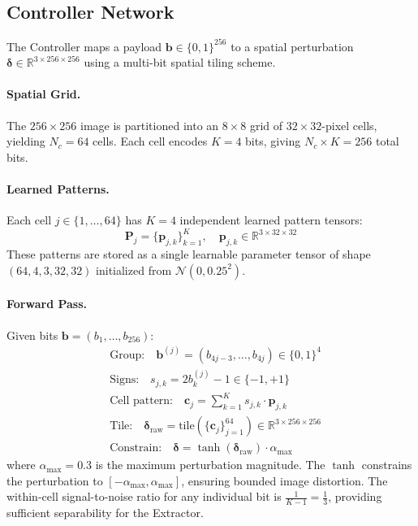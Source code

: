 \documentclass[10pt, twocolumn]{article}
\newcommand{\R}{\mathbb{R}}
\newcommand{\Ncal}{\mathcal{N}}
\begin{document}
\subsection{Controller Network}
\label{sec:controller}

The Controller maps a payload $\mathbf{b} \in \{0,1\}^{256}$ to a spatial perturbation $\bm{\delta} \in \R^{3 \times 256 \times 256}$ using a multi-bit spatial tiling scheme.

\paragraph{Spatial Grid.}
The $256 \times 256$ image is partitioned into an $8 \times 8$ grid of $32 \times 32$-pixel cells, yielding $N_c = 64$ cells.
Each cell encodes $K = 4$ bits, giving $N_c \times K = 256$ total bits.

\paragraph{Learned Patterns.}
Each cell $j \in \{1, \ldots, 64\}$ has $K = 4$ independent learned pattern tensors:
\begin{equation}
    \mathbf{P}_j = \{\mathbf{p}_{j,k}\}_{k=1}^{K}, \quad \mathbf{p}_{j,k} \in \R^{3 \times 32 \times 32}
    \label{eq:patterns}
\end{equation}
These patterns are stored as a single learnable parameter tensor of shape $(64, 4, 3, 32, 32)$ initialized from $\Ncal(0, 0.25^2)$.

\paragraph{Forward Pass.}
Given bits $\mathbf{b} = (b_1, \ldots, b_{256})$:
\begin{align}
    &\text{Group:} \quad \mathbf{b}^{(j)} = (b_{4j-3}, \ldots, b_{4j}) \in \{0,1\}^4 \label{eq:group} \\
    &\text{Signs:} \quad s_{j,k} = 2 b^{(j)}_k - 1 \in \{-1, +1\} \label{eq:signs} \\
    &\text{Cell pattern:} \quad \mathbf{c}_j = \sum_{k=1}^{K} s_{j,k} \cdot \mathbf{p}_{j,k} \label{eq:cell} \\
    &\text{Tile:} \quad \bm{\delta}_\text{raw} = \text{tile}(\{\mathbf{c}_j\}_{j=1}^{64}) \in \R^{3 \times 256 \times 256} \label{eq:tile} \\
    &\text{Constrain:} \quad \bm{\delta} = \tanh(\bm{\delta}_\text{raw}) \cdot \alpha_\text{max} \label{eq:constrain}
\end{align}
where $\alpha_\text{max} = 0.3$ is the maximum perturbation magnitude.
The $\tanh$ constrains the perturbation to $[-\alpha_\text{max}, \alpha_\text{max}]$, ensuring bounded image distortion.
The within-cell signal-to-noise ratio for any individual bit is $\frac{1}{K-1} = \frac{1}{3}$, providing sufficient separability for the Extractor.
\end{document}

